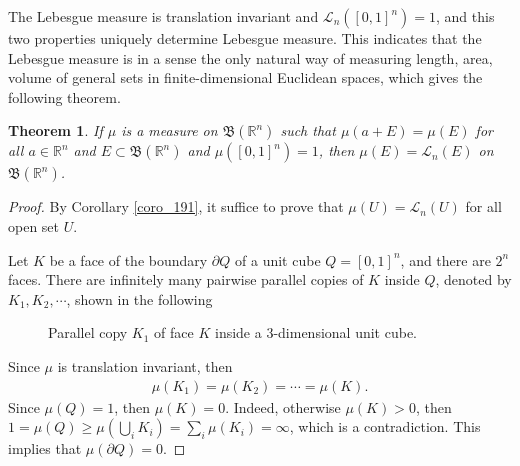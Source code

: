 \documentclass[11pt]{book}
\newtheorem{theorem}{Theorem}[chapter]
\theoremstyle{definition}
\numberwithin{equation}{chapter}
\def\BB{\mathfrak{B}}
\def\L{{\mathcal L}}
\begin{document}
\medskip

The Lebesgue measure is translation invariant and $\L_n([0,1]^n) = 1$, and this two properties uniquely determine Lebesgue measure. This indicates that the
Lebesgue measure is in a sense the only natural way of measuring length, area, volume of general sets in finite-dimensional Euclidean spaces, which gives the following theorem.

\medskip

\begin{theorem}\label{theorem_126}
If $\mu$ is a measure on $\BB(\mathbb{R}^n)$ such that $\mu(a+E) = \mu(E)$ for all $a \in \mathbb{R}^n$ and $E \subset \BB(\mathbb{R}^n)$ and $\mu([0,1]^n) = 1$, then $\mu(E) = \L_n(E)$ on $\BB(\mathbb{R}^n)$.
\end{theorem}
\begin{proof}
By Corollary \ref{coro_191}, it suffice to prove that $\mu(U) = \L_n(U)$ for all open set $U$. 

Let $K$ be a face of the boundary $\partial Q$ of a unit cube $Q = [0,1]^n$, and there are $2^n$ faces. There are infinitely many pairwise parallel copies of $K$ inside $Q$, denoted by $K_1, K_2, \cdots$, shown in the following
\begin{figure}[H]
    \centering
    \caption{Parallel copy $K_1$ of face $K$ inside a $3$-dimensional unit cube.}
    \label{fig:unit_cube_cut}
\end{figure}
Since $\mu$ is translation invariant, then 
\begin{align*}
    \mu(K_1) = \mu(K_2) = \cdots = \mu(K).
\end{align*}
Since $\mu(Q) = 1$, then $\mu(K) = 0$. Indeed, otherwise $\mu(K) > 0$, then $1 = \mu(Q) \geq \mu\left(\bigcup_i K_i\right) = \sum_i \mu(K_i) = \infty$, which is a contradiction. This implies that $\mu(\partial Q) = 0$. 


\end{proof}
\end{document}

